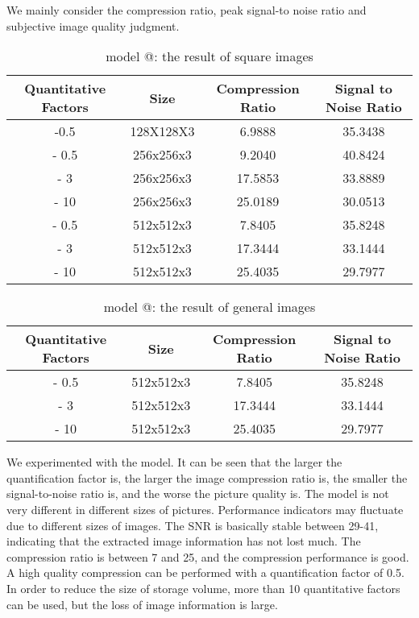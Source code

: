 \documentclass{mcmthesis}
\makeatletter
\newcommand{\Rmnum}[1]{\expandafter\@slowromancap\romannumeral #1@}
\makeatother
\begin{document}
We mainly consider the compression ratio, peak signal-to noise ratio and subjective image quality judgment.

\begin{table}[h]
\centering
\caption{model \Rmnum{1}: the result of square images }
\begin{tabular}{|c|c|c|c|}
\hline
Quantitative Factors & Size & Compression Ratio & Signal to Noise Ratio\\
\hline
-0.5 & 128X128X3 & 6.9888 & 35.3438\\
\hline
- 0.5 & 256x256x3 & 9.2040& 40.8424\\
\hline
- 3 & 256x256x3& 17.5853& 33.8889\\
\hline
- 10 & 256x256x3& 25.0189& 30.0513\\
\hline
- 0.5& 512x512x3& 7.8405 & 35.8248 \\
\hline
- 3 &  512x512x3& 17.3444& 33.1444 \\
\hline
- 10 & 512x512x3& 25.4035 &29.7977 \\
\hline
\end{tabular}
\label{tab2}
\end{table}

\begin{table}[h]
  \centering
  \caption{model \Rmnum{1}: the result of general images }
  \begin{tabular}{|c|c|c|c|}
  \hline
  Quantitative Factors & Size & Compression Ratio & Signal to Noise Ratio\\
  \hline
  - 0.5 &512x512x3& 7.8405 & 35.8248 \\
  \hline
  - 3 &  512x512x3& 17.3444 &33.1444 \\
  \hline
  - 10 & 512x512x3& 25.4035& 29.7977 \\
  \hline
  \end{tabular}
  \label{tab2}
  \end{table}

We experimented with the model. It can be seen that the larger the quantification factor is, the larger the image compression ratio is, the smaller the signal-to-noise ratio is, and the worse the picture quality is. The model is not very different in different sizes of pictures. Performance indicators may fluctuate due to different sizes of images.
The SNR is basically stable between 29-41, indicating that the extracted image information has not lost much. The compression ratio is between 7 and 25, and the compression performance is good.
A high quality compression can be performed with a quantification factor of 0.5. In order to reduce the size of storage volume, more than 10 quantitative factors can be used, but the loss of image information is large.
\end{document}
